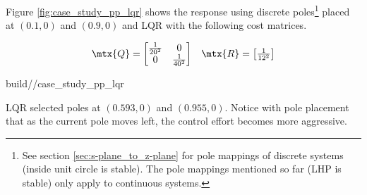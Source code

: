 Figure \ref{fig:case_study_pp_lqr} shows the response using discrete
poles\footnote{See section \ref{sec:s-plane_to_z-plane} for pole mappings of
discrete systems (inside unit circle is stable). The pole mappings mentioned so
far (LHP is stable) only apply to continuous systems.} placed at $(0.1, 0)$ and
$(0.9, 0)$ and LQR with the following cost matrices.

\begin{align*}
  \begin{array}{cc}
    \mtx{Q} = \begin{bmatrix}
      \frac{1}{20^2} & 0 \\
      0 & \frac{1}{40^2}
    \end{bmatrix} &
    \mtx{R} = \begin{bmatrix}
      \frac{1}{12^2}
    \end{bmatrix}
  \end{array}
\end{align*}

\begin{svg}{build/\chapterpath/case_study_pp_lqr}
  \caption{Second-order CIM motor response with pole placement and LQR}
  \label{fig:case_study_pp_lqr}
\end{svg}

LQR selected poles at $(0.593, 0)$ and $(0.955, 0)$. Notice with pole placement
that as the current pole moves left, the \gls{control effort} becomes more
aggressive.
